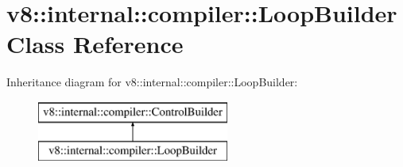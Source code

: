 \hypertarget{classv8_1_1internal_1_1compiler_1_1_loop_builder}{}\section{v8\+:\+:internal\+:\+:compiler\+:\+:Loop\+Builder Class Reference}
\label{classv8_1_1internal_1_1compiler_1_1_loop_builder}
Inheritance diagram for v8\+:\+:internal\+:\+:compiler\+:\+:Loop\+Builder\+:\begin{figure}[H]
\begin{center}
\leavevmode
\includegraphics[height=2.000000cm]{classv8_1_1internal_1_1compiler_1_1_loop_builder}
\end{center}
\end{figure}
